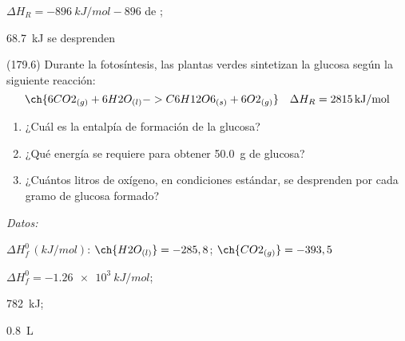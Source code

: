 \documentclass[10pt,a5paper,twoside]{article}
\newenvironment{gexdatos}{
      \vspace{4pt}
      \noindent\small\textit{Datos:}
    }{\vspace{5pt}}
\begin{document}
  \begin{solution}
    \begin{enumerate*}
      \item \( \Delta H_R = \SI{-896}{kJ/mol}-896 \) de ;
      \item \SI{68.7}{kJ} se desprenden
    \end{enumerate*}
  \end{solution}




  \begin{exercise}[
      tags    = {},
      topics  = {química, termodinámica, termoquímica},
      source  = {FQ 1B MGH 2016, p179, e6},
    ]
    (179.6) Durante la fotosíntesis, las plantas verdes sintetizan la glucosa según la siguiente reacción:
    \[ \ch{6 CO2_{(g)} + 6 H2O_{(l)} -> C6H12O6_{(s)} + 6 O2_{(g)}} \quad \Delta H_R = \SI{2815}{kJ/mol} \]
    \begin{enumerate}
      \item ¿Cuál es la entalpía de formación de la glucosa?
      \item ¿Qué energía se requiere para obtener \SI{50.0}{\gram} de glucosa?
      \item ¿Cuántos litros de oxígeno, en condiciones estándar, se desprenden por cada gramo de glucosa formado?
    \end{enumerate}

    \begin{gexdatos}
      \( \Delta H^0_f\,(\si{kJ/mol}) \): \( \ch{H2O_{(l)}} = -285,8 \); \( \ch    {CO2_{(g)}} = -393,5 \)
    \end{gexdatos}
  \end{exercise}

  \begin{solution}
    \begin{enumerate*}
      \item \( \Delta H^0_f = \SI{-1.26e3}{kJ/mol} \);
      \item \SI{782}{kJ};
      \item \SI{0.8}{\liter}
    \end{enumerate*}
  \end{solution}
\end{document}
